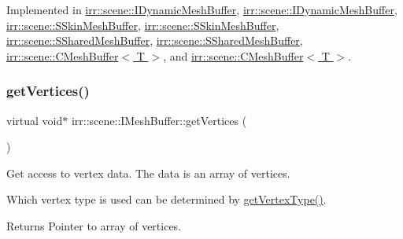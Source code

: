 Implemented in \hyperlink{classirr_1_1scene_1_1IDynamicMeshBuffer_a449643505823c7cfe793c5a82cde5fa4}{irr\+::scene\+::\+I\+Dynamic\+Mesh\+Buffer}, \hyperlink{classirr_1_1scene_1_1IDynamicMeshBuffer_a449643505823c7cfe793c5a82cde5fa4}{irr\+::scene\+::\+I\+Dynamic\+Mesh\+Buffer}, \hyperlink{structirr_1_1scene_1_1SSkinMeshBuffer_af9671765c9d6be2b6d99878e1bdb1b9d}{irr\+::scene\+::\+S\+Skin\+Mesh\+Buffer}, \hyperlink{structirr_1_1scene_1_1SSkinMeshBuffer_af9671765c9d6be2b6d99878e1bdb1b9d}{irr\+::scene\+::\+S\+Skin\+Mesh\+Buffer}, \hyperlink{structirr_1_1scene_1_1SSharedMeshBuffer_a43d93dd17ede5931189376c1518ee501}{irr\+::scene\+::\+S\+Shared\+Mesh\+Buffer}, \hyperlink{structirr_1_1scene_1_1SSharedMeshBuffer_a43d93dd17ede5931189376c1518ee501}{irr\+::scene\+::\+S\+Shared\+Mesh\+Buffer}, \hyperlink{classirr_1_1scene_1_1CMeshBuffer_a9173c9d0c6f32890ab75dc501aaf5be6}{irr\+::scene\+::\+C\+Mesh\+Buffer$<$ T $>$}, and \hyperlink{classirr_1_1scene_1_1CMeshBuffer_a9173c9d0c6f32890ab75dc501aaf5be6}{irr\+::scene\+::\+C\+Mesh\+Buffer$<$ T $>$}.

\mbox{\label{classirr_1_1scene_1_1IMeshBuffer_ac1695efc198b05a086487606bc2783e7}} 
\subsubsection{\texorpdfstring{get\+Vertices()}{getVertices()}\hspace{0.1cm}{\footnotesize\ttfamily [4/4]}}
{\footnotesize\ttfamily virtual void$\ast$ irr\+::scene\+::\+I\+Mesh\+Buffer\+::get\+Vertices (\begin{DoxyParamCaption}{ }\end{DoxyParamCaption})\hspace{0.3cm}{\ttfamily [pure virtual]}}



Get access to vertex data. The data is an array of vertices. 

Which vertex type is used can be determined by \hyperlink{classirr_1_1scene_1_1IMeshBuffer_a4d7a84ae4416487736f0ed0f519bb4f0}{get\+Vertex\+Type()}. \begin{DoxyReturn}{Returns}
Pointer to array of vertices. 
\end{DoxyReturn}


